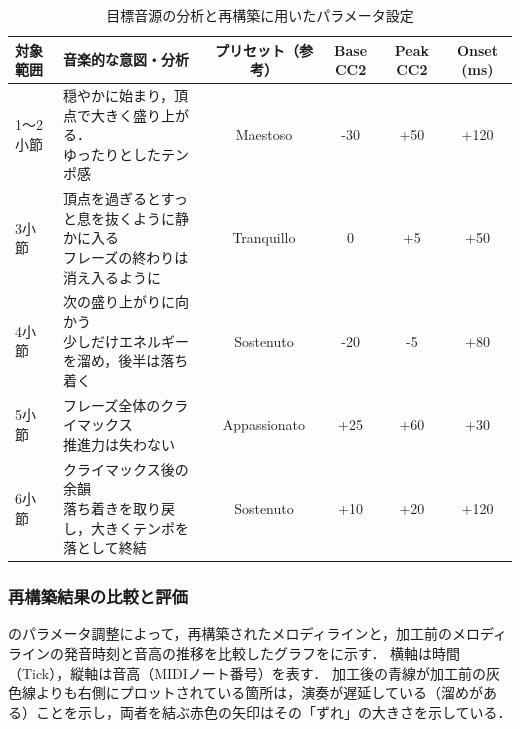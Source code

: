 \begin{table}[t]
	\centering
	\caption{目標音源の分析と再構築に用いたパラメータ設定}
	\label{tab:Air_params}
	\begin{tabular}{l|l|c|c|c|c} \hline
		\textbf{対象範囲} & \textbf{音楽的な意図・分析}                    & \textbf{プリセット（参考）} & \textbf{Base CC2} & \textbf{Peak CC2} & \textbf{Onset (ms)} \\ \hline \hline
		1〜2小節         & \shortstack[l]{穏やかに始まり，頂点で大きく盛り上がる．                                                                                      \\ ゆったりとしたテンポ感} & Maestoso & -30 & +50 & +120 \\ \hline
		3小節           & \shortstack[l]{頂点を過ぎるとすっと息を抜くように静かに入る                                                                                    \\ フレーズの終わりは消え入るように} & Tranquillo & 0 & +5 & +50 \\ \hline
		4小節           & \shortstack[l]{次の盛り上がりに向かう                                                                                               \\ 少しだけエネルギーを溜め，後半は落ち着く} & Sostenuto & -20 & -5 & +80 \\ \hline
		5小節           & \shortstack[l]{フレーズ全体のクライマックス                                                                                            \\ 推進力は失わない} & Appassionato & +25 & +60 & +30 \\ \hline
		6小節           & \shortstack[l]{クライマックス後の余韻                                                                                               \\ 落ち着きを取り戻し，大きくテンポを落として終結} & Sostenuto & +10 & +20 & +120 \\ \hline
	\end{tabular}
\end{table}

\subsubsection{再構築結果の比較と評価}
のパラメータ調整によって，再構築されたメロディラインと，加工前のメロディラインの発音時刻と音高の推移を比較したグラフをに示す．
横軸は時間（Tick），縦軸は音高（MIDIノート番号）を表す．
加工後の青線が加工前の灰色線よりも右側にプロットされている箇所は，演奏が遅延している（溜めがある）ことを示し，両者を結ぶ赤色の矢印はその「ずれ」の大きさを示している．

